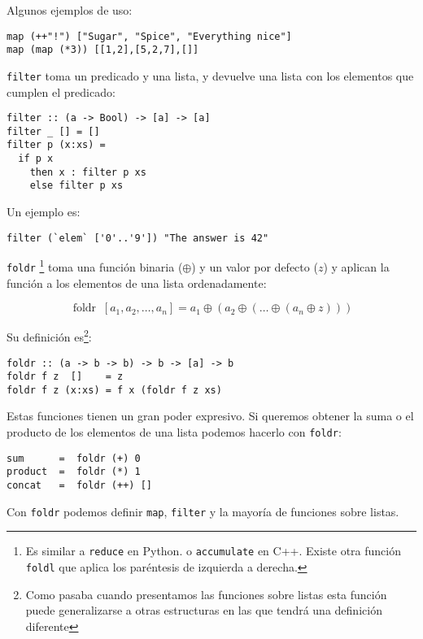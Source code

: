 Algunos ejemplos de uso:
\begin{lstlisting}
map (++"!") ["Sugar", "Spice", "Everything nice"]
map (map (*3)) [[1,2],[5,2,7],[]]
\end{lstlisting}

\texttt{filter} toma un predicado y una lista, y devuelve una lista con los elementos
que cumplen el predicado:
\begin{lstlisting}
filter :: (a -> Bool) -> [a] -> [a]
filter _ [] = []
filter p (x:xs) =
  if p x
    then x : filter p xs
    else filter p xs
\end{lstlisting}

Un ejemplo es:

\begin{lstlisting}
filter (`elem` ['0'..'9']) "The answer is 42"
\end{lstlisting}

\texttt{foldr}
\footnote{Es similar a \texttt{reduce} en Python. o \texttt{accumulate} en C++.
Existe otra función \texttt{foldl} que aplica los paréntesis de izquierda a derecha.}
toma una función binaria ($\oplus$) y un valor por defecto ($z$) y
aplican la función a los elementos de una lista ordenadamente:

\begin{equation*}
\operatorname{foldr} \; [a_1 , a_2 , \dots , a_n] =
 a_1 \oplus  (a_2 \oplus  (\dots \oplus  (a_n \oplus  z )))
\end{equation*}

Su definición es\footnote{Como pasaba cuando presentamos las funciones sobre listas esta función puede generalizarse a otras estructuras en las que tendrá una definición diferente}:

\begin{lstlisting}
foldr :: (a -> b -> b) -> b -> [a] -> b
foldr f z  []    = z
foldr f z (x:xs) = f x (foldr f z xs)
\end{lstlisting}

Estas funciones tienen un gran poder expresivo. Si queremos obtener la suma
o el producto de los elementos de una lista podemos hacerlo con \texttt{foldr}:

\begin{lstlisting}
sum      =  foldr (+) 0
product  =  foldr (*) 1
concat   =  foldr (++) []
\end{lstlisting}

Con \texttt{foldr} podemos definir \texttt{map}, \texttt{filter} y la mayoría de
funciones sobre listas.
